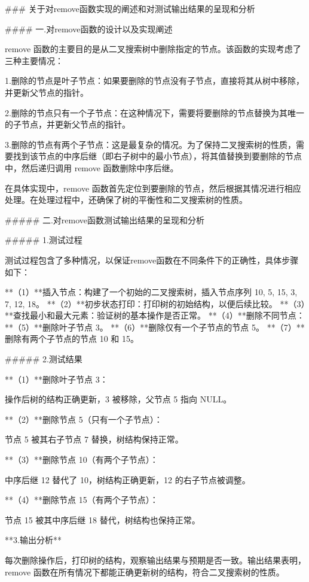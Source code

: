 ###                              关于对remove函数实现的阐述和对测试输出结果的呈现和分析



#### 一.对remove函数的设计以及实现阐述

 remove 函数的主要目的是从二叉搜索树中删除指定的节点。该函数的实现考虑了三种主要情况：

1.删除的节点是叶子节点：如果要删除的节点没有子节点，直接将其从树中移除，并更新父节点的指针。

2.删除的节点只有一个子节点：在这种情况下，需要将要删除的节点替换为其唯一的子节点，并更新父节点的指针。

3.删除的节点有两个子节点：这是最复杂的情况。为了保持二叉搜索树的性质，需要找到该节点的中序后继（即右子树中的最小节点），将其值替换到要删除的节点中，然后递归调用 remove 函数删除中序后继。

在具体实现中，remove 函数首先定位到要删除的节点，然后根据其情况进行相应处理。在处理过程中，还确保了树的平衡性和二叉搜索树的性质。

##### 二.对remove函数测试输出结果的呈现和分析

#####  1.测试过程

测试过程包含了多种情况，以保证remove函数在不同条件下的正确性，具体步骤如下：

**（1）**插入节点：构建了一个初始的二叉搜索树，插入节点序列 10, 5, 15, 3, 7, 12, 18。
**（2）**初步状态打印：打印树的初始结构，以便后续比较。
**（3）**查找最小和最大元素：验证树的基本操作是否正常。
**（4）**删除不同节点：
**（5）**删除叶子节点 3。
**（6）**删除仅有一个子节点的节点 5。
**（7）**删除有两个子节点的节点 10 和 15。

#####   2.测试结果

**（1）**删除叶子节点 3：

操作后树的结构正确更新，3 被移除，父节点 5 指向 NULL。

**（2）**删除节点 5（只有一个子节点）：

节点 5 被其右子节点 7 替换，树结构保持正常。

**（3）**删除节点 10（有两个子节点）：

中序后继 12 替代了 10，树结构正确更新，12 的右子节点被调整。

**（4）**删除节点 15（有两个子节点）：

节点 15 被其中序后继 18 替代，树结构也保持正常。



**3.输出分析**

​        每次删除操作后，打印树的结构，观察输出结果与预期是否一致。输出结果表明，remove 函数在所有情况下都能正确更新树的结构，符合二叉搜索树的性质。

